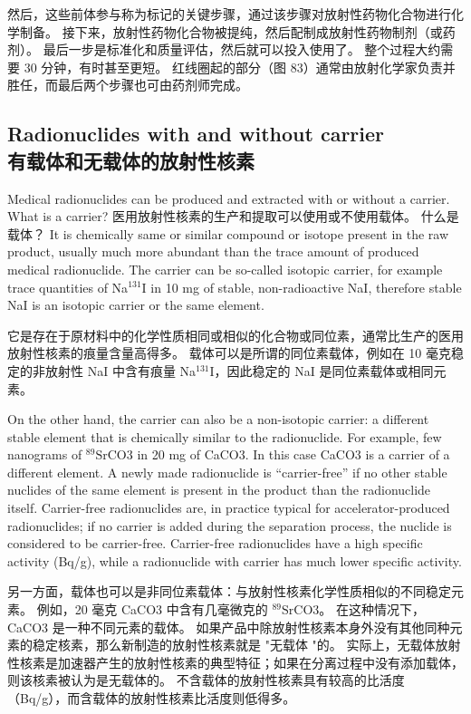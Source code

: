 \documentclass[dvipsnames, svgnames,a4paper,11pt]{article}
\begin{document}
然后，这些前体参与称为标记的关键步骤，通过该步骤对放射性药物化合物进行化学制备。 接下来，放射性药物化合物被提纯，然后配制成放射性药物制剂（或药剂）。 最后一步是标准化和质量评估，然后就可以投入使用了。 整个过程大约需要 30 分钟，有时甚至更短。 红线圈起的部分（图 83）通常由放射化学家负责并胜任，而最后两个步骤也可由药剂师完成。

\subsection{Radionuclides with and without carrier\\有载体和无载体的放射性核素}

Medical radionuclides can be produced and extracted with or without a carrier. What
is a carrier?
医用放射性核素的生产和提取可以使用或不使用载体。 什么是载体？
It is chemically same or similar compound or isotope present in the raw product,
usually much more abundant than the trace amount of produced medical
radionuclide. The carrier can be so-called isotopic carrier, for example trace
quantities of Na${}^{131}\mathrm{I}$ in 10 mg of stable, non-radioactive NaI, therefore stable NaI is an
isotopic carrier or the same element.

它是存在于原材料中的化学性质相同或相似的化合物或同位素，通常比生产的医用放射性核素的痕量含量高得多。 载体可以是所谓的同位素载体，例如在 10 毫克稳定的非放射性 NaI 中含有痕量 Na${}^{131}\mathrm{I}$，因此稳定的 NaI 是同位素载体或相同元素。

On the other hand, the carrier can also be a non-isotopic carrier: a different stable
element that is chemically similar to the radionuclide. For example, few nanograms
of ${}^{89}\mathrm{Sr}$CO3 in 20 mg of CaCO3. In this case CaCO3 is a carrier of a different element.
A newly made radionuclide is “carrier-free” if no other stable nuclides of the same
element is present in the product than the radionuclide itself. Carrier-free
radionuclides are, in practice typical for accelerator-produced radionuclides; if no
carrier is added during the separation process, the nuclide is considered to be
carrier-free. Carrier-free radionuclides have a high specific activity (Bq/g), while a
radionuclide with carrier has much lower specific activity.

另一方面，载体也可以是非同位素载体：与放射性核素化学性质相似的不同稳定元素。 例如，20 毫克 CaCO3 中含有几毫微克的 ${}^{89}\mathrm{Sr}$CO3。 在这种情况下，CaCO3 是一种不同元素的载体。 如果产品中除放射性核素本身外没有其他同种元素的稳定核素，那么新制造的放射性核素就是 "无载体 "的。 实际上，无载体放射性核素是加速器产生的放射性核素的典型特征；如果在分离过程中没有添加载体，则该核素被认为是无载体的。 不含载体的放射性核素具有较高的比活度（Bq/g），而含载体的放射性核素比活度则低得多。
\end{document}
